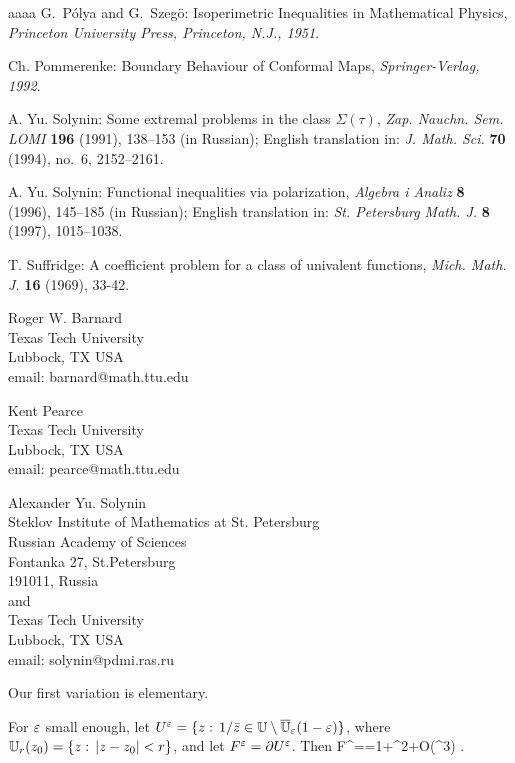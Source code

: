 \begin{thebibliography}{aaaa}
G.~P\'{o}lya and G.~Szeg\"{o}: Isoperimetric Inequalities in Mathematical Physics, \emph{Princeton University Press, Princeton, N.J., 1951}.

Ch. Pommerenke: Boundary Behaviour of Conformal Maps,
 \emph{Springer-Verlag, 1992}.

A. Yu. Solynin: Some extremal problems in the class $\Sigma(\tau)$, \emph
{Zap. Nauchn. Sem. LOMI} {\bf 196} (1991), 138--153 (in Russian);
English translation in: {\it J. Math. Sci.} {\bf 70} (1994),
no.~6, 2152--2161.


A. Yu. Solynin: Functional inequalities via polarization,
{\it Algebra i Analiz} {\bf 8} (1996), 145--185 (in Russian); English
translation in: {\it St. Petersburg Math. J.} {\bf 8} (1997),  1015--1038.


T. Suffridge: A coefficient problem for a class of univalent functions, {\it Mich. Math. J.} {\bf 16} (1969), 33-42.
\end{thebibliography}

\medskip
\noindent
Roger W. Barnard \\
Texas Tech University\\
Lubbock, TX USA\\
email: barnard@math.ttu.edu

\bigskip
\noindent
Kent Pearce \\
Texas Tech University\\
Lubbock, TX USA\\
email: pearce@math.ttu.edu

\bigskip
\noindent
Alexander Yu. Solynin\\
Steklov Institute of Mathematics at St. Petersburg\\
Russian Academy of Sciences\\
Fontanka 27, St.Petersburg\\
191011, Russia\\
and\\
Texas Tech University\\
Lubbock, TX USA\\
email: solynin@pdmi.ras.ru


%


Our first variation is elementary.

\bl \cite[Lemma~6]{BS}
For $\varepsilon$ small enough, let $U^\varepsilon=\{z:\,1/\bar z\in {\Bbb{U}}\setminus \overline{{\Bbb{U}}}_\varepsilon(1-\varepsilon)\}$, where ${\Bbb{U}}_r(z_0)=
\{z:\,|z-z_0|<r\}$, and let $F^\varepsilon=\partial U^\varepsilon$. Then
\be
\CAP F^\ep==1+\ep^2+O(\ep^3)  \quad \ep{}.
\ee
\el


